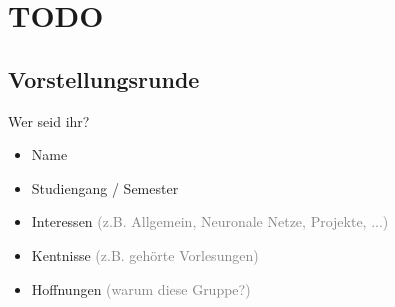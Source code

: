 \section{TODO}

\subsection*{Vorstellungsrunde}

\begin{frame}{Wer seid ihr?}
    \begin{itemize}
        \item Name
        \item Studiengang / Semester
        \item Interessen \textcolor{gray}{(z.B. Allgemein, Neuronale Netze, Projekte, ...)}
        \item Kentnisse \textcolor{gray}{(z.B. gehörte Vorlesungen)}
        \item Hoffnungen \textcolor{gray}{(warum diese Gruppe?)}
    \end{itemize}
\end{frame}
